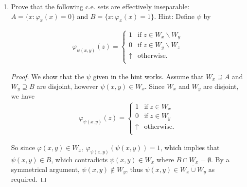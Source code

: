 \documentclass{article}
\begin{document}
\begin{enumerate}[label={\bf Q\arabic*:}]
\begin{enumerate}[label={(\roman*)}]
\begin{proof}
          The above procedure can be defined formally as follows: Let
          $h(x)$ be a recursive function such that $W_{h(x)}=W_x\cup
          \{\psi(x)\}$. $h$ exists from SMN. To compute $\psi'(n+1)$,
          enumerate
          \[\{\psi(n+1), \psi h(n+1), \psi h^2(n+1),\ldots\}\]
          until either some $y$ not in $\{\psi'(0),\ldots,\psi'(n)\}$ is
          found, or a repetition occurs. Then set $\psi'(n+1)=y$. Note that
          $\psi'$ will be total recursive from the Church-Turing thesis.
        \end{proof}

      \item Prove that the following c.e. sets are effectively inseparable:
        $A=\{x:\varphi_x(x)=0\}$ and $B=\{x:\varphi_x(x)=1\}$. Hint: Define
        $\psi$ by

        \begin{align*}
          \varphi_{\psi(x,y)}(z)=
          \begin{cases}
            1 &\text{if}\; z\in W_x\backslash W_y\\
            0 &\text{if}\; z\in W_y\backslash W_z\\
            \uparrow &\text{otherwise}.\\
          \end{cases}
        \end{align*}

        \begin{proof}
          We show that the $\psi$ given in the hint works. Assume that
          $W_x\supseteq A$ and $W_y\supseteq B$ are disjoint, however
          $\psi(x,y)\in W_x$. Since $W_x$ and $W_y$ are disjoint, we have
          \begin{align*}
            \varphi_{\psi(x,y)}(z)=
            \begin{cases}
              1 &\text{if}\; z\in W_x\\
              0 &\text{if}\; z\in W_y\\
              \uparrow &\text{otherwise}.\\
            \end{cases}
          \end{align*}

          So since $\varphi(x,y)\in W_x$,
          $\varphi_{\psi(x,y)}(\psi(x,y))=1$, which implies that
          $\psi(x,y)\in B$, which contradicts $\psi(x,y)\in W_x$ where
          $B\cap W_x=\emptyset$. By a symmetrical argument,
          $\psi(x,y)\not\in W_y$, thus $\psi(x,y)\in\overline{W_x\cup W_y}$
          as required.
        \end{proof}


\end{enumerate}
\end{enumerate}
\end{document}
